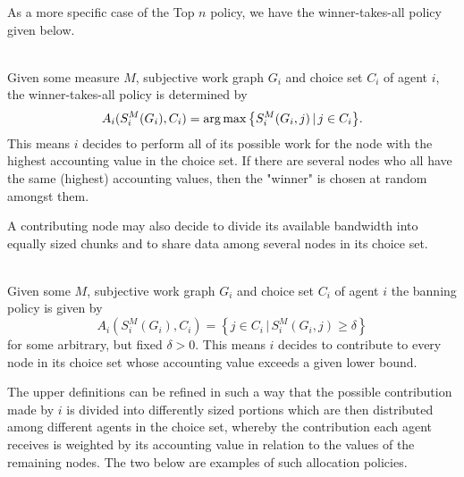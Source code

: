\noindent{}As a more specific case of the Top $n$ policy, we have the winner-takes-all policy given below.

\begin{example}\ \\
\label{ex:Winner-takes-all}
Given some measure $M$, subjective work graph $G_i$ and choice set $C_i$ of agent $i$, the winner-takes-all policy is determined by 
\[
A_i(S^M_i(G_i),C_i)=\operatorname*{arg\,max}{\left\lbrace{}S^M_i(G_i,j)\,|\,j\in{}C_i\right\rbrace}.
\]
\noindent{}This means $i$ decides to perform all of its possible work for the node with the highest accounting value in the choice set. If there are several nodes who all have the same (highest) accounting values, then the "winner" is chosen at random amongst them.\vspace{1em}\\
\end{example}

\noindent{}A contributing node may also decide to divide its available bandwidth into equally sized chunks and to share data among several nodes in its choice set.\vspace{1em}\\ 

\begin{example}\ \\
\label{ex:Banning Policy}
\noindent{}Given some $M$, subjective work graph $G_i$ and choice set $C_i$ of agent $i$ the banning policy is given by 
\[
A_i(S^M_i(G_i),C_i)=\left\lbrace{}j\in{}C_i\,|\,S^M_i(G_i,j)\geq\delta\right\rbrace 
\]
\noindent{}for some arbitrary, but fixed $\delta>0$. This means $i$ decides to contribute to every node in its choice set whose accounting value exceeds a given lower bound. \vspace{1em}\\
\end{example}

\noindent{}The upper definitions can be refined in such a way that the possible contribution made by $i$ is divided into differently sized portions which are then distributed among different agents in the choice set, whereby the contribution each agent receives is weighted by its accounting value in relation to the values of the remaining nodes. The two below are examples of such allocation policies.\vspace{1em}\\

